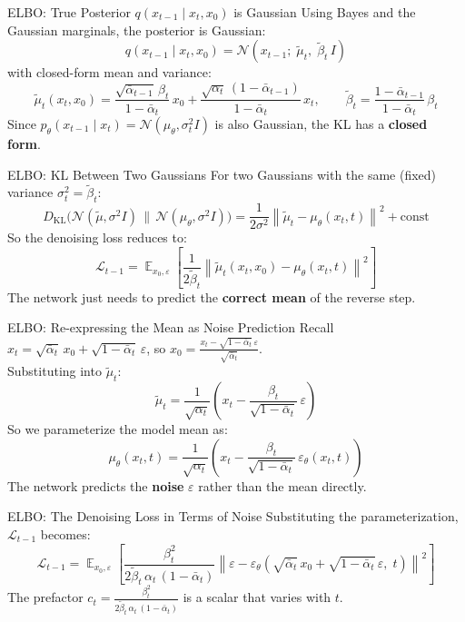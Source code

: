 \documentclass[10pt, aspectratio=169]{beamer}
\DeclareMathOperator*{\E}{\mathbb{E}}
\newcommand{\KL}{D_{\mathrm{KL}}}
\begin{document}
\begin{frame}{ELBO: True Posterior $q(x_{t-1}\mid x_t, x_0)$ is Gaussian}
  Using Bayes and the Gaussian marginals, the posterior is Gaussian:
  \[
    q(x_{t-1}\mid x_t, x_0) = \mathcal{N}(x_{t-1};\;\tilde\mu_t,\;\tilde\beta_t\,I)
  \]
  with closed-form mean and variance:
  \[
    \tilde\mu_t(x_t,x_0)
    = \frac{\sqrt{\bar\alpha_{t-1}}\,\beta_t}{1-\bar\alpha_t}\,x_0
    + \frac{\sqrt{\alpha_t}\,(1-\bar\alpha_{t-1})}{1-\bar\alpha_t}\,x_t,
    \qquad
    \tilde\beta_t = \frac{1-\bar\alpha_{t-1}}{1-\bar\alpha_t}\,\beta_t
  \]
  Since $p_\theta(x_{t-1}\mid x_t) = \mathcal{N}(\mu_\theta,\sigma_t^2 I)$ is also Gaussian,
  the KL has a \textbf{closed form}.
\end{frame}

\begin{frame}{ELBO: KL Between Two Gaussians}
  For two Gaussians with the same (fixed) variance $\sigma_t^2 = \tilde\beta_t$:
  \[
    \KL\!\bigl(\mathcal{N}(\tilde\mu,\sigma^2 I)\,\|\,\mathcal{N}(\mu_\theta,\sigma^2 I)\bigr)
    = \frac{1}{2\sigma^2}\left\|\tilde\mu_t - \mu_\theta(x_t,t)\right\|^2 + \text{const}
  \]
  So the denoising loss reduces to:
  \[
    \mathcal{L}_{t-1} = \E_{x_0,\varepsilon}\!\left[\frac{1}{2\tilde\beta_t}\left\|\tilde\mu_t(x_t,x_0) - \mu_\theta(x_t,t)\right\|^2\right]
  \]
  The network just needs to predict the \textbf{correct mean} of the reverse step.
\end{frame}

\begin{frame}{ELBO: Re-expressing the Mean as Noise Prediction}
  Recall $x_t = \sqrt{\bar\alpha_t}\,x_0 + \sqrt{1-\bar\alpha_t}\,\varepsilon$,
  so $x_0 = \frac{x_t - \sqrt{1-\bar\alpha_t}\,\varepsilon}{\sqrt{\bar\alpha_t}}$.\\[6pt]
  Substituting into $\tilde\mu_t$:
  \[
    \tilde\mu_t = \frac{1}{\sqrt{\alpha_t}}\!\left(x_t - \frac{\beta_t}{\sqrt{1-\bar\alpha_t}}\,\varepsilon\right)
  \]
  So we parameterize the model mean as:
  \[
    \mu_\theta(x_t,t) = \frac{1}{\sqrt{\alpha_t}}\!\left(x_t - \frac{\beta_t}{\sqrt{1-\bar\alpha_t}}\,\varepsilon_\theta(x_t,t)\right)
  \]
  The network predicts the \textbf{noise} $\varepsilon$ rather than the mean directly.
\end{frame}

\begin{frame}{ELBO: The Denoising Loss in Terms of Noise}
  Substituting the parameterization, $\mathcal{L}_{t-1}$ becomes:
  \[
    \mathcal{L}_{t-1} = \E_{x_0,\varepsilon}\!\left[
      \frac{\beta_t^2}{2\tilde\beta_t\,\alpha_t\,(1-\bar\alpha_t)}
      \left\|\varepsilon - \varepsilon_\theta\!\left(\sqrt{\bar\alpha_t}\,x_0 + \sqrt{1-\bar\alpha_t}\,\varepsilon,\;t\right)\right\|^2
    \right]
  \]
  The prefactor $c_t = \frac{\beta_t^2}{2\tilde\beta_t\,\alpha_t\,(1-\bar\alpha_t)}$ is a scalar that varies with $t$.
\end{frame}
\end{document}
